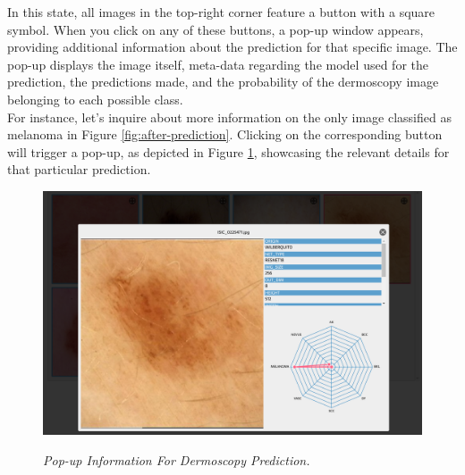 In this state, all images in the top-right corner feature a button with a
square symbol. When you click on any of these buttons, a pop-up window appears,
providing additional information about the prediction for that specific image.
The pop-up displays the image itself, meta-data regarding the model used for
the prediction, the predictions made, and the probability of the dermoscopy
image belonging to each possible class. \\

For instance, let's inquire about more information on the only image classified
as melanoma in Figure \ref{fig:after-prediction}. Clicking on the
corresponding button will trigger a pop-up, as depicted in Figure
\ref{fig:extra-inf-popup}, showcasing the relevant details for that particular
prediction.

\begin{figure}[H]
  \centering
  \includegraphics[width=\textwidth]{imatges/results/extra-inf-popup.png}
  \caption[Pop-up Information For Dermoscopy Prediction]{\textit{Pop-up Information For Dermoscopy Prediction. }}
  {\label{fig:extra-inf-popup}}
\end{figure}
